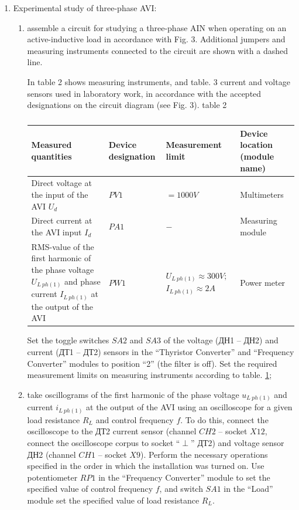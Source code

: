 \documentclass[a4paper,14pt]{article}
\begin{document}
\begin{enumerate}
\begin{enumerate}
\end{enumerate}


\item Experimental study of three-phase AVI:

\begin{enumerate}
\item assemble a circuit for studying a three-phase AIN when operating on an active-inductive load in accordance with Fig. 3. Additional jumpers and measuring instruments connected to the circuit are shown with a dashed line.

In table 2 shows measuring instruments, and table. 3 current and voltage sensors used in laboratory work, in accordance with the accepted designations on the circuit diagram (see Fig. 3).
table 2

\begin{table}[!ht]
\begin{tabular}{p{}p{}p{}p{}}
\toprule
Measured quantities& Device designation& Measurement limit & Device location (module name)\\
\midrule
Direct voltage at the input of the AVI $U_d$& $PV1$ & $=1000V$ &Multimeters\\
\midrule
Direct current at the AVI input $I_d$       & $PA1$ & $-$     & Measuring module\\
\midrule
RMS-value of the first harmonic of the phase voltage $U_{L\:ph(1)}$ and phase current $I_{L\:ph(1)}$ at the output of the AVI& $PW1$ &  $U_{L\:ph(1)}\approx 300V;$ $I_{L\:ph(1)}\approx 2A$ & 
Power meter
\end{tabular}
\caption{}
\label{table:II}
\end{table}
Set the toggle switches $SA2$ and $SA3$ of the voltage (ДН1 -- ДН2) and current (ДТ1 -- ДТ2) sensors in the “Thyristor Converter” and “Frequency Converter” modules to position “2” (the filter is off). Set the required measurement limits on measuring instruments according to table. \ref{table:II};


\item take oscillograms of the first harmonic of the phase voltage $u_{L\:ph(1)}$ and current $i_{L\:ph(1)}$ at the output of the AVI using an oscilloscope for a given load resistance $R_L$ and control frequency $f$. To do this, connect the oscilloscope to the ДТ2 current sensor
(channel $CH2$ -- socket $X12$, connect the oscilloscope corpus to socket “$\perp$” ДТ2) and voltage sensor ДН2 (channel $CH1$ -- socket $X9$). Perform the necessary operations specified in the order in which the installation was turned on. Use potentiometer $RP1$ in the “Frequency Converter” module to set the specified value of control frequency $f$, and switch $SA1$ in the “Load” module set the specified value of load resistance $R_L$.


\end{enumerate}
\end{enumerate}
\end{document}
